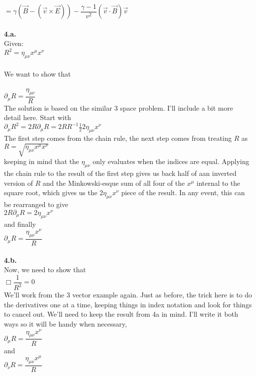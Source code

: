 \documentclass[prb,preprint]
{revtex4-1}
\newcommand{\PRLsep}{\noindent\makebox[\linewidth]{\resizebox{0.8888\linewidth}{2pt}{$\bullet$}}\bigskip}
\begin{document}
\\
$= \gamma\left(\vec{B} - \left(\vec{v} \times \vec{E}\right)\right) - \dfrac{\gamma - 1}{v^2}\left(\vec{v} \cdot \vec{B}\right)\vec{v}$
\\
\PRLsep
\\
\textbf{4.a.}
\\
Given:
\\
$R^2 = \eta_{\mu\nu} x^\mu x^\nu$
\\\\
We want to show that 
\\
\\
$\partial_\mu R = \dfrac{\eta_{\mu\nu}}{R}$
\\
The solution is based on the similar 3 space problem.  I'll include a bit more detail here.  Start with
\\
$\partial_\mu R^2 = 2R \partial_\mu R = 2R R^{-1} \frac{1}{2} 2 \eta_{\mu\nu} x^\nu$
\\
The first step comes from the chain rule, the next step comes from treating $R$ as 
\\
$R = \sqrt{\eta_{\mu\nu} x^\mu x^\nu}$
\\
keeping in mind that the $\eta_{\mu\nu}$ only evaluates when the indices are equal.  Applying the chain rule to the result of the first step gives us back half of aan inverted version of $R$ and the Minkowski-esque sum of all four of the $x^\mu$ internal to the square root, which gives us the $2\eta_{\mu\nu}x^\nu$ piece of the result.  In any event, this can be rearranged to give
\\
$2R\partial_\mu R = 2 \eta_{\mu\nu} x^\nu $
\\
and finally
\\
$\partial_\mu R = \dfrac{\eta_{\mu\nu} x^\nu}{R} $
\\
\PRLsep
\\
\textbf{4.b.}
\\
Now, we need to show that 
\\
$\Box \dfrac{1}{R^2} = 0$
\\
We'll work from the 3 vector example again.  Just as before, the trick here is to do the derivatives one at a time, keeping things in index notation and look for things to cancel out.  We'll need to keep the result from 4a in mind.  I'll write it both ways so it will be handy when necessary,
\\
$\partial_\mu R = \dfrac{\eta_{\mu\nu} x^\nu}{R}$
\\
and
\\
$\partial_\nu R = \dfrac{\eta_{\mu\nu} x^\mu}{R}$
\end{document}
